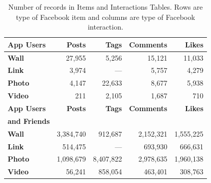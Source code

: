 \begin{table}
\centering
\caption{\small Number of records in Items and Interactions Tables. Rows are type of Facebook item and columns are type of Facebook interaction.}
\label{tab:interactions}
\begin{tabular}{|>{\small}l|>{\small}r|>{\small}r|>{\small}r|>{\small}r|}
\hline
\textbf{App Users} & \textbf{Posts} & \textbf{Tags} & \textbf{Comments} & \textbf{Likes} \\
\hline
\textbf{Wall} & 27,955 & 5,256 & 15,121 & 11,033 \\
\hline
\textbf{Link} & 3,974 & --- & 5,757 & 4,279 \\
\hline
\textbf{Photo} & 4,147 & 22,633 & 8,677 & 5,938 \\
\hline
\textbf{Video} & 211 & 2,105 & 1,687 & 710 \\
\hline
\hline
\textbf{App Users} & \textbf{Posts} & \textbf{Tags} & \textbf{Comments} & \textbf{Likes} \\
\textbf{and Friends} & & & & \\
\hline
\textbf{Wall} & 3,384,740 & 912,687 & 2,152,321 & 1,555,225 \\
\hline
\textbf{Link} & 514,475 & --- & 693,930 & 666,631 \\
\hline
\textbf{Photo} & 1,098,679 & 8,407,822 & 2,978,635 & 1,960,138 \\
\hline
\textbf{Video} & 56,241 & 858,054 & 463,401 & 308,763 \\
\hline
\end{tabular}
\end{table}




